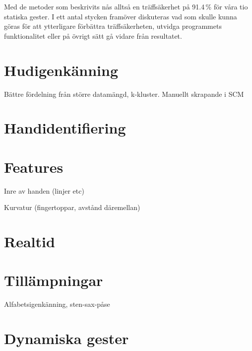 \documentclass[../rapport_MVEX01-11-05]{subfiles}
\begin{document}
Med de metoder som beskrivits nås alltså en träffsäkerhet på 91.4\,\%
för våra tio statiska gester. I ett antal stycken framöver diskuteras
vad som skulle kunna göras för att ytterligare förbättra
träffsäkerheten, utvidga programmets funktionalitet eller på övrigt
sätt gå vidare från resultatet.

\section{Hudigenkänning}
Bättre fördelning från större datamängd, k-kluster.
Manuellt skrapande i SCM
\section{Handidentifiering}
\section{Features}
Inre av handen (linjer etc)

Kurvatur (fingertoppar, avstånd däremellan)

\section{Realtid}
\section{Tillämpningar}
Alfabetsigenkänning, sten-sax-påse

\section{Dynamiska gester}
\end{document}
